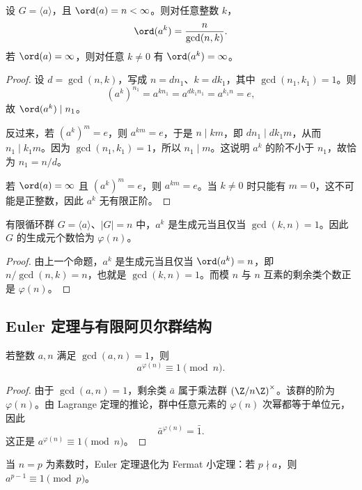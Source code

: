 \begin{proposition}[循环群中元素的阶]
设 $G=\langle a \rangle$，且 $\ord(a)=n<\infty$。则对任意整数 $k$，
\[
 \ord(a^k)=\frac{n}{\gcd(n,k)}.
\]
若 $\ord(a)=\infty$，则对任意 $k\ne0$ 有 $\ord(a^k)=\infty$。
\end{proposition}

\begin{proof}
设 $d=\gcd(n,k)$，写成 $n=dn_1$、$k=dk_1$，其中 $\gcd(n_1,k_1)=1$。则
\[
 (a^k)^{n_1}=a^{kn_1}=a^{dk_1n_1}=a^{k_1n}=e,
\]
故 $\ord(a^k)\mid n_1$。

反过来，若 $(a^k)^m=e$，则 $a^{km}=e$，于是 $n\mid km$，即 $dn_1\mid dk_1m$，从而 $n_1\mid k_1m$。因为 $\gcd(n_1,k_1)=1$，所以 $n_1\mid m$。这说明 $a^k$ 的阶不小于 $n_1$，故恰为 $n_1=n/d$。

若 $\ord(a)=\infty$ 且 $(a^k)^m=e$，则 $a^{km}=e$。当 $k\ne0$ 时只能有 $m=0$，这不可能是正整数，因此 $a^k$ 无有限正阶。
\end{proof}

\begin{corollary}
有限循环群 $G=\langle a \rangle$、$|G|=n$ 中，$a^k$ 是生成元当且仅当 $\gcd(k,n)=1$。因此 $G$ 的生成元个数恰为 $\varphi(n)$。
\end{corollary}

\begin{proof}
由上一个命题，$a^k$ 是生成元当且仅当 $\ord(a^k)=n$，即 $n/\gcd(n,k)=n$，也就是 $\gcd(k,n)=1$。而模 $n$ 与 $n$ 互素的剩余类个数正是 $\varphi(n)$。
\end{proof}

\subsection*{Euler 定理与有限阿贝尔群结构}

\begin{theorem}[Euler 定理]
若整数 $a,n$ 满足 $\gcd(a,n)=1$，则
\[
 a^{\varphi(n)} \equiv 1 \pmod n.
\]
\end{theorem}

\begin{proof}
由于 $\gcd(a,n)=1$，剩余类 $\bar a$ 属于乘法群 $\left(\Z/n\Z\right)^\times$。该群的阶为 $\varphi(n)$。由 Lagrange 定理的推论，群中任意元素的 $\varphi(n)$ 次幂都等于单位元，因此
\[
 \bar a^{\varphi(n)}=\bar 1.
\]
这正是 $a^{\varphi(n)} \equiv 1 \pmod n$。
\end{proof}

\begin{remark}
当 $n=p$ 为素数时，Euler 定理退化为 Fermat 小定理：若 $p\nmid a$，则 $a^{p-1}\equiv1 \pmod p$。
\end{remark}

